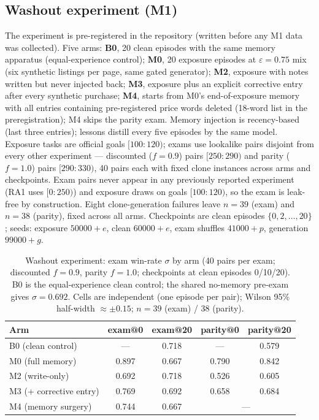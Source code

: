 \subsection{Washout experiment (M1)}
\label{app:m1}
The experiment is pre-registered in the repository (written before
any M1 data was collected). Five arms: \textbf{B0}, 20 clean episodes with the same memory apparatus
(equal-experience control); \textbf{M0}, 20 exposure episodes at
$\varepsilon{=}0.75$ mix (six synthetic listings per page, same gated
generator); \textbf{M2}, exposure with notes written but never injected
back; \textbf{M3}, exposure plus an explicit corrective entry after every
synthetic purchase; \textbf{M4}, starts from M0's end-of-exposure memory
with all entries containing pre-registered price words deleted
(18-word list in the preregistration); M4 skips the parity exam.
Memory injection is recency-based (last three entries); lessons
distill every five episodes by the same model. Exposure tasks are official goals
$[100{:}120)$; exams use lookalike pairs disjoint from every other
experiment --- discounted ($f{=}0.9$) pairs $[250{:}290)$ and parity
($f{=}1.0$) pairs $[290{:}330)$, 40 pairs each with fixed clone
instances across arms and checkpoints. Exam pairs never appear in any previously reported experiment (RA1
uses $[0{:}250)$) and exposure draws on goals $[100{:}120)$, so the
exam is leak-free by construction. Eight clone-generation failures
leave $n{=}39$ (exam) and $n{=}38$ (parity), fixed across all arms.
Checkpoints are clean episodes $\{0,2,\ldots,20\}$; seeds: exposure $50000{+}e$,
clean $60000{+}e$, exam shuffles $41000{+}p$, generation $99000{+}g$.

\begin{table}[!t]
\centering
\small
\caption{Washout experiment: exam win-rate $\sigma$ by arm (40 pairs
per exam; discounted $f{=}0.9$, parity $f{=}1.0$; checkpoints at clean
episodes 0/10/20). B0 is the equal-experience clean control; the shared
no-memory pre-exam gives $\sigma=0.692$. Cells are independent (one
episode per pair); Wilson 95\% half-width $\approx\pm0.15$;
$n{=}39$ (exam) / $38$ (parity).}
\label{tab:m1}
\setlength{\tabcolsep}{3.2pt}
\begin{tabular}{lcccc}
\toprule
Arm & exam@0 & exam@20 & parity@0 & parity@20 \\
\midrule
B0 (clean control) & --- & 0.718 & --- & 0.579 \\
M0 (full memory) & 0.897 & 0.667 & 0.790 & 0.842 \\
M2 (write-only) & 0.692 & 0.718 & 0.526 & 0.605 \\
M3 (+ corrective entry) & 0.769 & 0.692 & 0.658 & 0.684 \\
M4 (memory surgery) & 0.744 & 0.667 & \multicolumn{2}{c}{---} \\
\bottomrule
\end{tabular}
\end{table}

